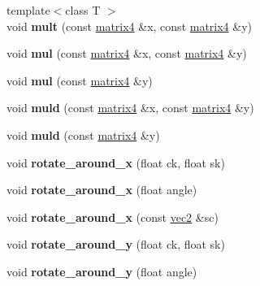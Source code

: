 \begin{DoxyCompactItemize}
{\footnotesize template$<$class T $>$ }\\void {\bfseries mult} (const \hyperlink{structmatrix4}{matrix4} \&x, const \hyperlink{structmatrix4}{matrix4} \&y)
\item 
\mbox{\label{structmatrix4_a4f86bb677c991ef15f7d39fef36c07ac}} 
void {\bfseries mul} (const \hyperlink{structmatrix4}{matrix4} \&x, const \hyperlink{structmatrix4}{matrix4} \&y)
\item 
\mbox{\label{structmatrix4_aeadd68ae4c8178d96c203c2116ac5c7c}} 
void {\bfseries mul} (const \hyperlink{structmatrix4}{matrix4} \&y)
\item 
\mbox{\label{structmatrix4_ac4b2c706990e4faa991415103e2412f7}} 
void {\bfseries muld} (const \hyperlink{structmatrix4}{matrix4} \&x, const \hyperlink{structmatrix4}{matrix4} \&y)
\item 
\mbox{\label{structmatrix4_a7bd0ee7015949b148a82475d776c8361}} 
void {\bfseries muld} (const \hyperlink{structmatrix4}{matrix4} \&y)
\item 
\mbox{\label{structmatrix4_a83d8b85db7acebb41462a555e72d60cb}} 
void {\bfseries rotate\+\_\+around\+\_\+x} (float ck, float sk)
\item 
\mbox{\label{structmatrix4_abd3f0eb598f3befe9eade86597c7d37a}} 
void {\bfseries rotate\+\_\+around\+\_\+x} (float angle)
\item 
\mbox{\label{structmatrix4_a7b3dfa1026739304c93270066d18c07f}} 
void {\bfseries rotate\+\_\+around\+\_\+x} (const \hyperlink{structvec2}{vec2} \&sc)
\item 
\mbox{\label{structmatrix4_a9f4ba9941945158caa7b148e6edfe6e8}} 
void {\bfseries rotate\+\_\+around\+\_\+y} (float ck, float sk)
\item 
\mbox{\label{structmatrix4_af83fff93e08c00416c644648583144ea}} 
void {\bfseries rotate\+\_\+around\+\_\+y} (float angle)
\item 
\mbox{\label{structmatrix4_a60f2e3a8f0e9966881e1f6bcf23052b2}} 

\end{DoxyCompactItemize}
